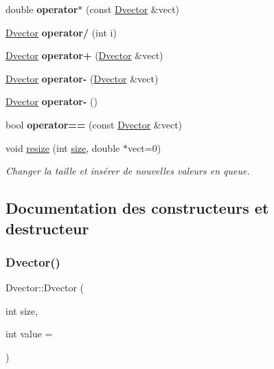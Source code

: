 \begin{DoxyCompactItemize}
\mbox{\label{class_dvector_abe59641937a4b5222445c3df1618ee2c}} 
double {\bfseries operator$\ast$} (const \hyperlink{class_dvector}{Dvector} \&vect)
\item 
\mbox{\label{class_dvector_a281d788b6a6c1c7b076684c20f63210f}} 
\hyperlink{class_dvector}{Dvector} {\bfseries operator/} (int i)
\item 
\mbox{\label{class_dvector_ad6d5934a4a49287611e35fc1bdd8d357}} 
\hyperlink{class_dvector}{Dvector} {\bfseries operator+} (\hyperlink{class_dvector}{Dvector} \&vect)
\item 
\mbox{\label{class_dvector_a27515c1928c6602c0b8b5a9c5a7dfffe}} 
\hyperlink{class_dvector}{Dvector} {\bfseries operator-\/} (\hyperlink{class_dvector}{Dvector} \&vect)
\item 
\mbox{\label{class_dvector_a402617afbca77199f537110a8efc0e10}} 
\hyperlink{class_dvector}{Dvector} {\bfseries operator-\/} ()
\item 
\mbox{\label{class_dvector_ae124565a643023393c191cc0acaa44b5}} 
bool {\bfseries operator==} (const \hyperlink{class_dvector}{Dvector} \&vect)
\item 
void \hyperlink{class_dvector_a3df83649e0ed9cf7c21fe03fdef8b2f4}{resize} (int \hyperlink{class_dvector_adda9654f389de24c744e897e93f850fb}{size}, double $\ast$vect=0)
\begin{DoxyCompactList}\small\item\em Changer la taille et insérer de nouvelles valeurs en queue. \end{DoxyCompactList}\end{DoxyCompactItemize}


\subsection{Documentation des constructeurs et destructeur}
\mbox{\label{class_dvector_a8a4feb509178ccc26a7d3805548fab17}} 
\subsubsection{\texorpdfstring{Dvector()}{Dvector()}\hspace{0.1cm}{\footnotesize\ttfamily [1/2]}}
{\footnotesize\ttfamily Dvector\+::\+Dvector (\begin{DoxyParamCaption}\item[{int}]{size,  }\item[{int}]{value = {} }\end{DoxyParamCaption})}

